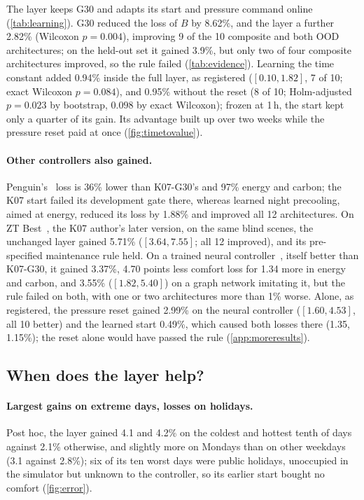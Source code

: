\documentclass{article}
\begin{document}
The layer keeps G30 and adapts its start and pressure command online (\cref{tab:learning}). G30
reduced the loss of $B$ by 8.62\%, and the layer a further
2.82\% (Wilcoxon $p = 0.004$),
improving 9 of the 10 composite and both OOD architectures; on the held-out set it gained 3.9\%, but only two of four
composite architectures improved, so the rule failed (\cref{tab:evidence}). Learning the time constant added 0.94\% inside the full layer, as
registered ($[0.10, 1.82]$, 7 of 10; exact Wilcoxon $p = 0.084$), and 0.95\% without the reset (8 of 10; Holm-adjusted $p = 0.023$ by bootstrap, $0.098$ by exact Wilcoxon); frozen at
1\,h, the start kept only a quarter of its gain. Its advantage built up over two weeks while the
pressure reset paid at once (\cref{fig:timetovalue}).

\paragraph{Other controllers also gained.}\label{sec:second}\label{sec:maintenance}
Penguin's~\cite{penguin2026deep} loss is 36\% lower than K07-G30's and 97\% energy and carbon; the K07 start
failed its development gate there, whereas learned night precooling, aimed at energy, reduced its loss by 1.88\% and
improved all 12 architectures. On ZT Best~\cite{malyshev2026zt}, the K07 author's later version, on the same blind scenes, the unchanged layer
gained 5.71\% ($[3.64, 7.55]$; all 12 improved), and its pre-specified maintenance rule held. On a trained neural
controller~\cite{chilton2026resppo}, itself better than K07-G30, it gained 3.37\%, 4.70 points less comfort loss
for 1.34 more in energy and carbon, and 3.55\% ($[1.82, 5.40]$) on a graph network imitating it, but the rule failed on both, with one or two architectures
more than 1\% worse. Alone, as registered, the pressure reset gained 2.99\% on the neural controller ($[1.60, 4.53]$, all 10
better) and the learned start 0.49\%, which caused both losses there (1.35, 1.15\%); the reset alone would have passed
the rule (\cref{app:moreresults}).

\subsection{When does the layer help?}\label{sec:when}
\paragraph{Largest gains on extreme days, losses on holidays.}\label{sec:erroranalysis}
Post hoc, the layer gained 4.1 and 4.2\% on the coldest and hottest tenth of days against 2.1\% otherwise, and slightly
more on Mondays than on other weekdays (3.1 against 2.8\%); six of its ten worst days were public holidays, unoccupied in the simulator but unknown to the controller, so its earlier start bought no comfort (\cref{fig:error}).
\end{document}
